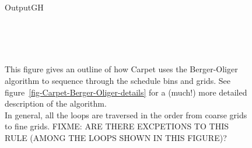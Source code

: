 \documentclass{article}
\def\thorn#1{\textbf{#1}}
\begin{document}
\begin{figure}[bp]
\begin{center}
{{\begin{minipage}[t]{0.87\textwidth}
OutputGH
\end{minipage}}}
\\
\\
\\
\end{center}
\caption[Summary of the \thorn{Carpet} schedule]
	{
	This figure gives an outline of how Carpet uses the
	Berger-Oliger algorithm to sequence through the
	schedule bins and grids.
	See figure~\protect\ref{fig-Carpet-Berger-Oliger-details}
	for a (much!) more detailed description of the algorithm.	\\
	In general, all the loops are traversed in the order
	from coarse grids to fine grids.
	FIXME: ARE THERE EXCPETIONS TO THIS RULE
	(AMONG THE LOOPS SHOWN IN THIS FIGURE)?
	}
\label{fig-Carpet-Berger-Oliger-summary}
\end{figure}
\end{document}
